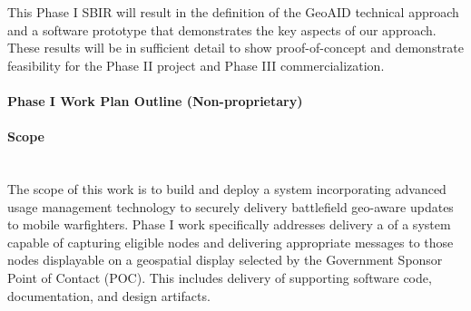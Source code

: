 \documentclass{sbir}
\begin{document}
{This Phase I SBIR will result in the definition of the GeoAID technical approach and a software prototype that demonstrates the key aspects of our approach. These results will be in sufficient detail to show proof-of-concept and demonstrate feasibility for the Phase II project and Phase III commercialization.}

\newpage 
\pagestyle{nonproprietary}

\paragraph{Phase I Work Plan Outline (Non-proprietary)}
\paragraph{Scope}~\\
The scope of this work is to build and deploy a system incorporating advanced usage management technology to securely delivery battlefield geo-aware updates to mobile warfighters. Phase I work specifically addresses delivery a of a system capable of capturing eligible nodes and delivering appropriate messages to those nodes displayable on a geospatial display selected by the Government Sponsor Point of Contact (POC). This includes delivery of supporting software code, documentation, and design artifacts.
\end{document}
